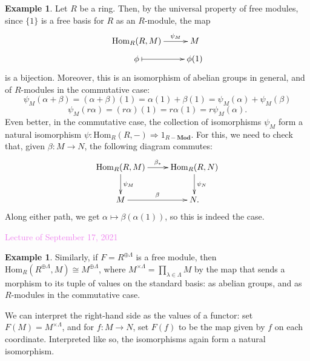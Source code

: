 \documentclass{amsart}[12pt]
\newcommand{\Hom}{\mathrm{Hom}}
\newcommand{\Sept}[1]{\textcolor{violet}{Lecture of September #1, 2021}}
\numberwithin{equation}{section}
\theoremstyle{plain} %
\theoremstyle{definition}
\newtheorem{ex}[equation]{Example}
\theoremstyle{remark}
\newcommand{\Mod}[1]{#1-\mathbf{Mod}}
\begin{document}
\begin{ex} Let $R$ be a ring. Then, by the universal property of free modules, since $\{1\}$ is a free basis for $R$ as an $R$-module, the map
\[\xymatrix@R=.5em { \Hom_R(R,M) \ar[r]^-{\psi_M} &M \\
\phi \ar@{|->}[r] &\phi(1) }\]
is a bijection. Moreover, this is an isomorphism of abelian groups in general, and of $R$-modules in the commutative case:
\[ \psi_M(\alpha+\beta) = (\alpha+\beta)(1) = \alpha(1) + \beta(1) = \psi_M(\alpha) + \psi_M(\beta)\]
\[\psi_M(r\alpha) = (r\alpha)(1) = r\alpha(1) = r\psi_M(\alpha).\]
Even better, in the commutative case, the collection of isomorphisms $\psi_M$ form a natural isomorphism $\psi: \Hom_R(R,-) \Rightarrow 1_{\Mod{R}}$. For this, we need to check that, given $\beta:M\to N$, the following diagram commutes:
\[\xymatrix{ \Hom_R(R,M) \ar[r]^-{\beta_*} \ar[d]^-{\psi_M} & \Hom_R(R,N) \ar[d]^-{\psi_N}\\ M \ar[r]^-{\beta}  & N.}\]
Along either path, we get $\alpha \mapsto \beta(\alpha(1))$, so this is indeed the case.
\end{ex}



\Sept{17}

\begin{ex}
Similarly, if $F=R^{\oplus \Lambda}$ is a free module, then $\Hom_R(R^{\oplus \Lambda},M) \cong M^{\oplus \Lambda}$, where $M^{\times \Lambda}= \prod_{\lambda\in \Lambda} M$ by the map that sends a morphism to its tuple of values on the standard basis: as abelian groups, and as $R$-modules in the commutative case. 

We can interpret the right-hand side as the values of a functor: set $F(M) = M^{\times \Lambda}$, and for $f:M\to N$, set $F(f)$ to be the map given by $f$ on each coordinate. Interpreted like so, the isomorphisms again form a natural isomorphism.
\end{ex}
\end{document}
